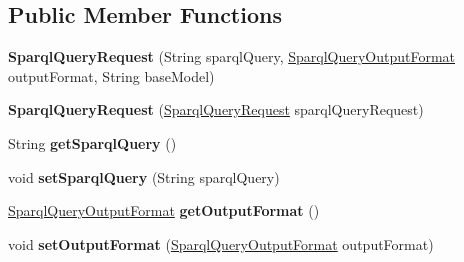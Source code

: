 \subsection*{Public Member Functions}
\begin{DoxyCompactItemize}
\item 
\mbox{\label{classeu_1_1h2020_1_1symbiote_1_1core_1_1ci_1_1SparqlQueryRequest_aa269ed9b0034046aed638a2138c2ec67}} 
{\bfseries Sparql\+Query\+Request} (String sparql\+Query, \hyperlink{enumeu_1_1h2020_1_1symbiote_1_1core_1_1ci_1_1SparqlQueryOutputFormat}{Sparql\+Query\+Output\+Format} output\+Format, String base\+Model)
\item 
\mbox{\label{classeu_1_1h2020_1_1symbiote_1_1core_1_1ci_1_1SparqlQueryRequest_a1b785ac6b0fc3c25462ff49703ed505e}} 
{\bfseries Sparql\+Query\+Request} (\hyperlink{classeu_1_1h2020_1_1symbiote_1_1core_1_1ci_1_1SparqlQueryRequest}{Sparql\+Query\+Request} sparql\+Query\+Request)
\item 
\mbox{\label{classeu_1_1h2020_1_1symbiote_1_1core_1_1ci_1_1SparqlQueryRequest_a023587b8826d4b54c29c5aa60c0772eb}} 
String {\bfseries get\+Sparql\+Query} ()
\item 
\mbox{\label{classeu_1_1h2020_1_1symbiote_1_1core_1_1ci_1_1SparqlQueryRequest_afb2bba89ada1e5d361dc532e0b0f8271}} 
void {\bfseries set\+Sparql\+Query} (String sparql\+Query)
\item 
\mbox{\label{classeu_1_1h2020_1_1symbiote_1_1core_1_1ci_1_1SparqlQueryRequest_a9b62286f091f5d738d92ca212036a6fc}} 
\hyperlink{enumeu_1_1h2020_1_1symbiote_1_1core_1_1ci_1_1SparqlQueryOutputFormat}{Sparql\+Query\+Output\+Format} {\bfseries get\+Output\+Format} ()
\item 
\mbox{\label{classeu_1_1h2020_1_1symbiote_1_1core_1_1ci_1_1SparqlQueryRequest_a321cbc9e84ba7686c77c8ef59b6e955c}} 
void {\bfseries set\+Output\+Format} (\hyperlink{enumeu_1_1h2020_1_1symbiote_1_1core_1_1ci_1_1SparqlQueryOutputFormat}{Sparql\+Query\+Output\+Format} output\+Format)

\end{DoxyCompactItemize}
